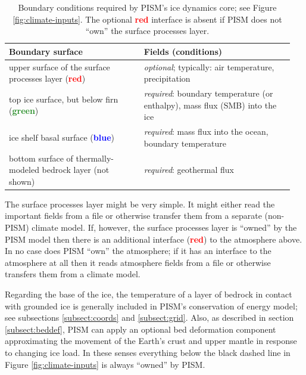 \begin{table}[ht]
  \centering
 \begin{tabular}{p{0.45\linewidth}p{0.5\linewidth}}
    \toprule
    \textbf{Boundary surface} & \textbf{Fields (conditions)} \\
    \midrule
    upper surface of the surface processes layer (\textcolor{red}{\textbf{red}}) & \emph{optional}; typically: air temperature, precipitation \\
    top ice surface, but below firn (\textcolor{ForestGreen}{\textbf{green}}) & \emph{required}: boundary temperature (or enthalpy), mass flux (SMB) into the ice\\
    ice shelf basal surface (\textcolor{blue}{\textbf{blue}}) & \emph{required}: mass flux into the ocean, boundary temperature\\
    bottom surface of thermally-modeled bedrock layer (not shown) & \emph{required}: geothermal flux\\
   \bottomrule
  \end{tabular}
\caption{Boundary conditions required by PISM's ice dynamics core; see Figure \ref{fig:climate-inputs}.  The optional \textcolor{red}{\textbf{red}} interface is absent if PISM does not ``own'' the surface processes layer.}
\label{tab:ice-dynamics-bc}
\end{table}

The surface processes layer might be very simple.  It might either read the important fields from a file or otherwise transfer them from a separate (non-PISM) climate model.  If, however, the surface processes layer is ``owned'' by the PISM model then there is an additional interface (\textcolor{red}{\textbf{red}}) to the atmosphere above.  In no case does PISM ``own'' the atmosphere; if it has an interface to the atmosphere at all then it reads atmosphere fields from a file or otherwise transfers them from a climate model.

Regarding the base of the ice, the temperature of a layer of bedrock in contact with grounded ice is generally included in PISM's conservation of energy model; see subsections \ref{subsect:coords} and \ref{subsect:grid}.   Also, as described in section \ref{subsect:beddef}, PISM can apply an optional bed deformation component approximating the movement of the Earth's crust and upper mantle in response to changing ice load.  In these senses everything below the black dashed line in Figure \ref{fig:climate-inputs} is always ``owned'' by PISM.

